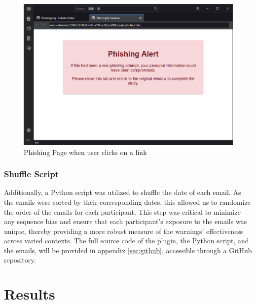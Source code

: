 \documentclass[
  a4paper,  %
  twoside,  %
  bibliography=totoc,
  headsepline,
  cleardoublepage=empty,
  parskip=half,
  draft=false
]{scrbook}
\begin{document}
\begin{figure} [ht]
    \centering
    \includegraphics[width=1\linewidth]{figures/mockpage.png}
    \caption{Phishing Page when user clicks on a link}
    \label{fig:mock}
\end{figure}


\subsection{Shuffle Script}
Additionally, a Python script was utilized to shuffle the date of each email. As the emails were sorted by their corresponding dates, this allowed us to randomize the order of the emails for each participant. This step was critical to minimize any sequence bias and ensure that each participant's exposure to the emails was unique, thereby providing a more robust measure of the warnings' effectiveness across varied contexts. The full source code of the plugin, the Python script, and the emails, will be provided in appendix \ref{sec:github}, accessible through a GitHub repository.

\chapter{Results}
\label{results}
\end{document}
